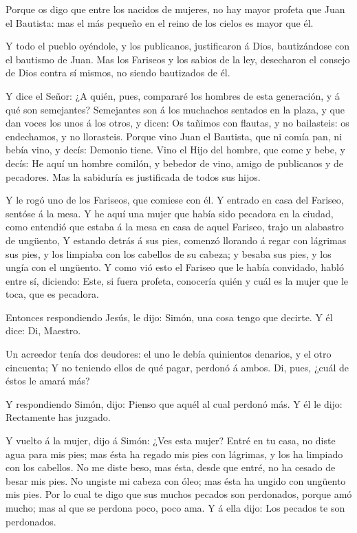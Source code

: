  Porque os digo que entre los nacidos de mujeres, no hay
mayor profeta que Juan el Bautista: mas el más pequeño en el reino de
los cielos es mayor que él.

 Y todo el pueblo oyéndole, y los publicanos, justificaron
á Dios, bautizándose con el bautismo de Juan.  Mas los
Fariseos y los sabios de la ley, desecharon el consejo de Dios contra sí
mismos, no siendo bautizados de él.

 Y dice el Señor: ¿A quién, pues, compararé los hombres de
esta generación, y á qué son semejantes?  Semejantes son á
los muchachos sentados en la plaza, y que dan voces los unos á los
otros, y dicen: Os tañimos con flautas, y no bailasteis: os endechamos,
y no llorasteis.  Porque vino Juan el Bautista, que ni
comía pan, ni bebía vino, y decís: Demonio tiene.  Vino el
Hijo del hombre, que come y bebe, y decís: He aquí un hombre comilón, y
bebedor de vino, amigo de publicanos y de pecadores.  Mas
la sabiduría es justificada de todos sus hijos.

 Y le rogó uno de los Fariseos, que comiese con él. Y
entrado en casa del Fariseo, sentóse á la mesa.  Y he aquí
una mujer que había sido pecadora en la ciudad, como entendió que estaba
á la mesa en casa de aquel Fariseo, trajo un alabastro de ungüento,
 Y estando detrás á sus pies, comenzó llorando á regar con
lágrimas sus pies, y los limpiaba con los cabellos de su cabeza; y
besaba sus pies, y los ungía con el ungüento.  Y como vió
esto el Fariseo que le había convidado, habló entre sí, diciendo: Este,
si fuera profeta, conocería quién y cuál es la mujer que le toca, que es
pecadora.

 Entonces respondiendo Jesús, le dijo: Simón, una cosa
tengo que decirte. Y él dice: Di, Maestro.

 Un acreedor tenía dos deudores: el uno le debía quinientos
denarios, y el otro cincuenta;  Y no teniendo ellos de qué
pagar, perdonó á ambos. Di, pues, ¿cuál de éstos le amará más?

 Y respondiendo Simón, dijo: Pienso que aquél al cual
perdonó más. Y él le dijo: Rectamente has juzgado.

 Y vuelto á la mujer, dijo á Simón: ¿Ves esta mujer? Entré
en tu casa, no diste agua para mis pies; mas ésta ha regado mis pies con
lágrimas, y los ha limpiado con los cabellos.  No me diste
beso, mas ésta, desde que entré, no ha cesado de besar mis pies.
 No ungiste mi cabeza con óleo; mas ésta ha ungido con
ungüento mis pies.  Por lo cual te digo que sus muchos
pecados son perdonados, porque amó mucho; mas al que se perdona poco,
poco ama.  Y á ella dijo: Los pecados te son perdonados.

